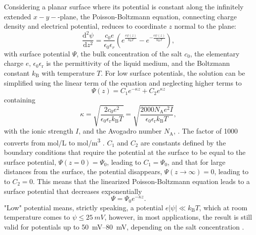 Considering a planar surface where its potential is constant along the infinitely extended $x-y-$-plane, the Poisson-Boltzmann equation, connecting charge density and electrical potential, reduces to coordinate $z$ normal to the plane:
\begin{equation}
    \frac{\text{d}^2 \psi}{\text{d}z^2} = \frac{c_0e}{\epsilon_0\epsilon_r}\left( e^{\frac{e \psi (z)}{k_\mathrm{B}T}}- e^{-\frac{e \psi (z)}{k_\mathrm{B}T}} \right),
\end{equation}
with surface potential $\Psi$, the bulk concentration of the salt $c_0$, the elementary charge $e$, $\epsilon_\mathrm{0} \epsilon_\mathrm{r}$ is the permittivity of the liquid medium, and the Boltzmann constant $k_{\mathrm{B}}$ with temperature $T$. 
For low surface potentials, the solution can be simplified using the linear term of the equation and neglecting higher terms to\cite{Butt2018}
\begin{equation}
    \Psi(z) = C_1e^{-\kappa z} + C_2e^{\kappa z} 
\end{equation}
containing 
\begin{equation}\label{eq:kappa}
    \kappa = \sqrt{\frac{2 c_0 e^2}{\epsilon_{\mathrm{0}} \epsilon_{\mathrm{r}} k_{\mathrm{B}}T}} = \sqrt{\frac{2000 N_\mathrm{A} e^2 I}{\epsilon_{\mathrm{0}} \epsilon_{\mathrm{r}} k_{\mathrm{B}}T}}, 
\end{equation}
with the ionic strength $I$, and the Avogadro number $N_\mathrm{A}$, \cite{Butt2018, WirixSpeetjens2005}.
The factor of 1000 converts from \si{mol/L} to \si{mol/\cubic\m} \cite{WirixSpeetjens2005}.
$C_1$ and $C_2$ are constants defined by the boundary conditions that require the potential at the surface to be equal to the surface potential, $\Psi(z=0) = \Psi_0$, leading to $C_1 = \Psi_0$\cite{Butt2018}, and that for large distances from the surface, the potential disappears, $\Psi(z\rightarrow \infty) = 0$, leading to to $C_2=0$\cite{Butt2018}.
This means that the linearized Poisson-Boltzmann equation leads to a surface potential that decreases exponentially 
\begin{equation}\label{eq:surface_potential}
    \Psi = \Psi_0 e^{-\kappa z}.
\end{equation}
"Low" potential means, strictly speaking, a potential $e|\psi| \ll k_\mathrm{B}T$, which at room temperature comes to $\psi \leq \SI{25}{mV}$, however, in most applications, the result is still valid for potentials up to \SIrange{50}{80}{mV}, depending on the salt concentration \cite{Butt2018}.  
